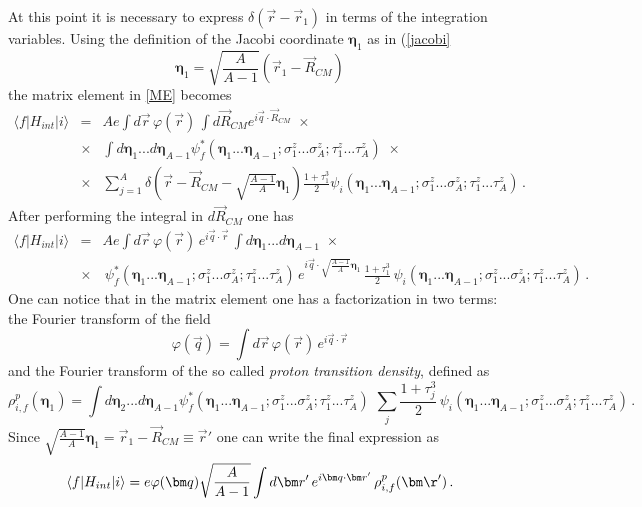 At this point it is necessary to express 
$\delta(\vec r-\vec r_1)$ in terms of the integration variables. Using the definition of the Jacobi coordinate $\bm{\eta}_1$  
as in (\ref{jacobi}
\begin{equation}
\bm{\eta}_1=\sqrt{\frac{A}{A-1}}(\vec r_1 - \vec R_{CM})
\end{equation}
the matrix element in \ref{ME} becomes
\begin{eqnarray}\label{MEE} 
 \langle f|H_{int}|i\rangle &=& A e \int d\vec r \,\varphi(\vec r)\,\int d\vec R_{CM}  e^{i\vec q\cdot\vec R_{CM}}
  \,\,\times \nonumber\\
 &\times& \int d\bm{\eta}_1...d\bm{\eta}_{A-1}\psi^*_f(\bm{\eta}_1...\bm{\eta}_{A-1}; 
 \sigma_1^z...\sigma_A^z;\tau_1^z...\tau_A^z)\,\,\times \nonumber\\
 &\times&\sum_{j=1}^A  \delta\left(\vec r-\vec R_{CM}-\sqrt{\frac{A-1}{A}} 
 \bm{\eta}_1\right)\frac{1+\tau_1^3}{2} \psi_i(\bm{\eta}_1...\bm{\eta}_{A-1}; 
 \sigma_1^z...\sigma_A^z;\tau_1^z...\tau_A^z)\,.
\end{eqnarray}
After performing the integral in $d\vec R_{CM}$ one has
\begin{eqnarray}   
 \langle f|H_{int}|i\rangle &=& A e \int d\vec r \,\varphi(\vec r)\,e^{i\vec q\cdot\vec r}\,\int d\bm{\eta}_1...d\bm{\eta}_{A-1} 
  \,\,\times \nonumber\\
&\times&\, \psi^*_f(\bm{\eta}_1...\bm{\eta}_{A-1}; \sigma_1^z...\sigma_A^z;\tau_1^z...\tau_A^z)\,
e^{i\vec q\cdot\sqrt{\frac{A-1}{A}}\bm{\eta}_1}\,\frac{1+\tau_1^3}{2} \,\psi_i(\bm{\eta}_1...\bm{\eta}_{A-1}; 
 \sigma_1^z...\sigma_A^z;\tau_1^z...\tau_A^z)\,.
\end{eqnarray}
One can notice that in the matrix element one has a factorization in two terms: the Fourier transform of the field 
\begin{equation}
 \varphi(\vec q)=\int d\vec r \,\varphi(\vec r)\,e^{i\vec q\cdot\vec r}
\end{equation}
and the Fourier transform of the so called {\it proton transition density}, defined as
\begin{equation}
 \rho_{i,f}^p(\bm{\eta}_1) =\int d\bm{\eta}_2...d\bm{\eta}_{A-1} 
 \psi^*_f(\bm{\eta}_1...\bm{\eta}_{A-1}; \sigma_1^z...\sigma_A^z;\tau_1^z...\tau_A^z)\,
\,\sum_j\frac{1+\tau_j^3}{2} \,\psi_i(\bm{\eta}_1...\bm{\eta}_{A-1}; 
 \sigma_1^z...\sigma_A^z;\tau_1^z...\tau_A^z)\,.
\end{equation}
Since $\sqrt{\frac{A-1}{A}}\bm{\eta}_1=\vec r_1-\vec R_{CM}\equiv \vec r'$ one can write  the final expression as
\begin{equation}
\langle f|H_{int}|i\rangle =  e \varphi(\vec q) \sqrt{\frac{A}{A-1}}\int d\vec r' \,e^{i\vec q\cdot\vec r'}\, \rho^p_{i,f}(\vec \r')\,.
\end{equation}

